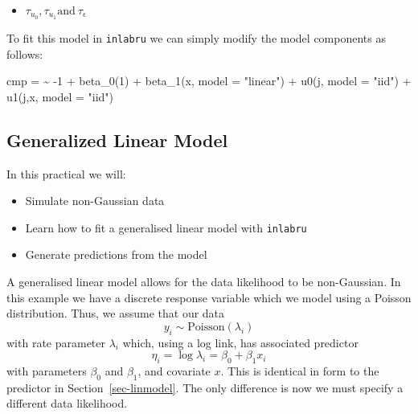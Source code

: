 \documentclass[
  letterpaper,
  DIV=11,
  numbers=noendperiod]{scrartcl}
\newenvironment{Shaded}{\begin{snugshade}}{\end{snugshade}}
\newcommand{\AttributeTok}[1]{\textcolor[rgb]{0.40,0.45,0.13}{#1}}
\newcommand{\DecValTok}[1]{\textcolor[rgb]{0.68,0.00,0.00}{#1}}
\newcommand{\ErrorTok}[1]{\textcolor[rgb]{0.68,0.00,0.00}{#1}}
\newcommand{\FunctionTok}[1]{\textcolor[rgb]{0.28,0.35,0.67}{#1}}
\newcommand{\NormalTok}[1]{\textcolor[rgb]{0.00,0.23,0.31}{#1}}
\newcommand{\OtherTok}[1]{\textcolor[rgb]{0.00,0.23,0.31}{#1}}
\newcommand{\SpecialCharTok}[1]{\textcolor[rgb]{0.37,0.37,0.37}{#1}}
\newcommand{\StringTok}[1]{\textcolor[rgb]{0.13,0.47,0.30}{#1}}
\providecommand{\tightlist}{%
  \setlength{\itemsep}{0pt}\setlength{\parskip}{0pt}}\usepackage{longtable,booktabs,array}
\begin{document}
\begin{tcolorbox}
\begin{itemize}
  \begin{itemize}
  \tightlist
  \item
    \(\tau_{u_0},\tau_{u_1} \text{and}~\tau_\epsilon\)
  \end{itemize}
\end{itemize}

To fit this model in \texttt{inlabru} we can simply modify the model
components as follows:

\begin{Shaded}
\begin{Highlighting}[]
\NormalTok{cmp }\OtherTok{=}  \ErrorTok{\textasciitilde{}} \SpecialCharTok{{-}}\DecValTok{1} \SpecialCharTok{+} \FunctionTok{beta\_0}\NormalTok{(}\DecValTok{1}\NormalTok{) }\SpecialCharTok{+} \FunctionTok{beta\_1}\NormalTok{(x, }\AttributeTok{model =} \StringTok{"linear"}\NormalTok{) }\SpecialCharTok{+}
  \FunctionTok{u0}\NormalTok{(j, }\AttributeTok{model =} \StringTok{"iid"}\NormalTok{) }\SpecialCharTok{+} \FunctionTok{u1}\NormalTok{(j,x, }\AttributeTok{model =} \StringTok{"iid"}\NormalTok{)}
\end{Highlighting}
\end{Shaded}

\end{tcolorbox}

\subsection{Generalized Linear Model}\label{sec-genlinmodel}

In this practical we will:

\begin{itemize}
\tightlist
\item
  Simulate non-Gaussian data
\item
  Learn how to fit a generalised linear model with \texttt{inlabru}
\item
  Generate predictions from the model
\end{itemize}

A generalised linear model allows for the data likelihood to be
non-Gaussian. In this example we have a discrete response variable which
we model using a Poisson distribution. Thus, we assume that our data \[
y_i \sim \text{Poisson}(\lambda_i)
\] with rate parameter \(\lambda_i\) which, using a log link, has
associated predictor \[
\eta_i = \log \lambda_i = \beta_0 + \beta_1 x_i 
\] with parameters \(\beta_0\) and \(\beta_1\), and covariate \(x\).
This is identical in form to the predictor in
Section~\ref{sec-linmodel}. The only difference is now we must specify a
different data likelihood.
\end{document}
